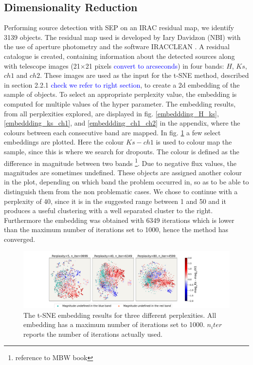 \subsection{Dimensionality Reduction}
Performing source detection with SEP on an IRAC residual map, we identify 3139 objects. The residual map used is developed by Iary Davidzon (NBI) with the use of aperture photometry and the software IRACCLEAN \cite{Hsieh_2012_IRACCLEAN}. A residual catalogue is created, containing  information about the detected sources along with telescope images (21$\times$21 pixels \textcolor{blue}{convert to arcseconds}) in four bands: $H$, $Ks$, $ch1$ and $ch2$. These images are used as the input for the t-SNE method, described in section 2.2.1 \textcolor{blue}{check we refer to right section}, to create a 2d embedding of the sample of objects. To select an appropriate perplexity value, the embedding is computed for multiple values of the hyper parameter. The embedding results, from all perplexities explored, are displayed in fig. \ref{embeddding_H_ks}, \ref{embeddding_ks_ch1}, and \ref{embeddding_ch1_ch2} in the appendix, where the colours between each consecutive band are mapped. In fig. \ref{SMALL_embeddding_ks_ch1} a few select embeddings are plotted. Here the colour $Ks-ch1$ is used to colour map the sample, since this is where we search for dropouts. The colour is defined as the difference in magnitude between two bands \footnote{reference to MBW book}. Due to negative flux values, the magnitudes are sometimes undefined. These objects are assigned another colour in the plot, depending on which band the problem occurred in, so as to be able to distinguish them from the non problematic cases. We chose to continue with a perplexity of 40, since it is in the suggested range between 1 and 50 and it produces a useful clustering with a well separated cluster to the right. Furthermore the embedding was obtained with 6349 iterations which is lower than the maximum number of iterations set to 1000, hence the method has converged.
\begin{figure}[]
    \centering %
    \includegraphics[trim={5cm 0cm 5cm 0.5cm},clip,width=\textwidth]{Code/Saved_Figures/peplex_Ks_ch1_SMALL.pdf}
    \caption{The t-SNE embedding results for three different perplexities. All embedding has a maximum number of iterations set to 1000. $n_iter$ reports the number of iterations actually used.}
    \label{SMALL_embeddding_ks_ch1}
\end{figure}

